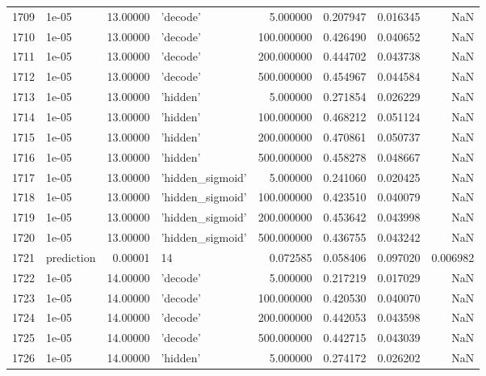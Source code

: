\documentclass[10pt,a4paper]{article}
\begin{document}
\begin{tabular}{llrlrrrr}
1709 &       1e-05 &  13.00000 &           'decode' &    5.000000 &  0.207947 &  0.016345 &       NaN \\
1710 &       1e-05 &  13.00000 &           'decode' &  100.000000 &  0.426490 &  0.040652 &       NaN \\
1711 &       1e-05 &  13.00000 &           'decode' &  200.000000 &  0.444702 &  0.043738 &       NaN \\
1712 &       1e-05 &  13.00000 &           'decode' &  500.000000 &  0.454967 &  0.044584 &       NaN \\
1713 &       1e-05 &  13.00000 &           'hidden' &    5.000000 &  0.271854 &  0.026229 &       NaN \\
1714 &       1e-05 &  13.00000 &           'hidden' &  100.000000 &  0.468212 &  0.051124 &       NaN \\
1715 &       1e-05 &  13.00000 &           'hidden' &  200.000000 &  0.470861 &  0.050737 &       NaN \\
1716 &       1e-05 &  13.00000 &           'hidden' &  500.000000 &  0.458278 &  0.048667 &       NaN \\
1717 &       1e-05 &  13.00000 &   'hidden\_sigmoid' &    5.000000 &  0.241060 &  0.020425 &       NaN \\
1718 &       1e-05 &  13.00000 &   'hidden\_sigmoid' &  100.000000 &  0.423510 &  0.040079 &       NaN \\
1719 &       1e-05 &  13.00000 &   'hidden\_sigmoid' &  200.000000 &  0.453642 &  0.043998 &       NaN \\
1720 &       1e-05 &  13.00000 &   'hidden\_sigmoid' &  500.000000 &  0.436755 &  0.043242 &       NaN \\
1721 &  prediction &   0.00001 &                 14 &    0.072585 &  0.058406 &  0.097020 &  0.006982 \\
1722 &       1e-05 &  14.00000 &           'decode' &    5.000000 &  0.217219 &  0.017029 &       NaN \\
1723 &       1e-05 &  14.00000 &           'decode' &  100.000000 &  0.420530 &  0.040070 &       NaN \\
1724 &       1e-05 &  14.00000 &           'decode' &  200.000000 &  0.442053 &  0.043598 &       NaN \\
1725 &       1e-05 &  14.00000 &           'decode' &  500.000000 &  0.442715 &  0.043039 &       NaN \\
1726 &       1e-05 &  14.00000 &           'hidden' &    5.000000 &  0.274172 &  0.026202 &       NaN \\

\end{tabular}
\end{document}
